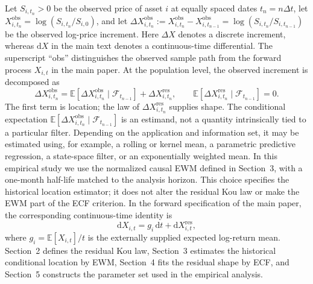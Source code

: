 \documentclass[11pt]{article}
\newcommand{\E}{\mathbb{E}}
\newcommand{\diff}{\mathrm{d}}
\begin{document}
Let $S_{i,t_n}>0$ be the observed price of asset $i$ at equally spaced dates
$t_n=n\Delta t$, let $X_{i,t_n}^{\mathrm{obs}}=\log(S_{i,t_n}/S_{i,0})$, and let
$\Delta X_{i,t_n}^{\mathrm{obs}}
:=X_{i,t_n}^{\mathrm{obs}}-X_{i,t_{n-1}}^{\mathrm{obs}}
=\log(S_{i,t_n}/S_{i,t_{n-1}})$ be the observed log-price increment. Here $\Delta X$
denotes a discrete increment, whereas $\diff X$ in the main text denotes a continuous-time
differential.
The superscript ``obs'' distinguishes the observed sample path from the forward process
$X_{i,t}$ in the main paper. At the population level, the observed increment is decomposed as
\begin{equation}\label{eq:population-location-shape}
\Delta X_{i,t_n}^{\mathrm{obs}}
=
\E\!\left[\Delta X_{i,t_n}^{\mathrm{obs}}\mid\mathcal F_{t_{n-1}}\right]
+\Delta X_{i,t_n}^{\mathrm{res}},
\qquad
\E\!\left[\Delta X_{i,t_n}^{\mathrm{res}}\mid\mathcal F_{t_{n-1}}\right]=0.
\end{equation}
The first term is location; the law of $\Delta X_{i,t_n}^{\mathrm{res}}$ supplies shape.
The conditional expectation
$\E[\Delta X_{i,t_n}^{\mathrm{obs}}\mid\mathcal F_{t_{n-1}}]$ is an estimand, not a
quantity intrinsically tied to a particular filter. Depending on the application and
information set, it may be estimated using, for example, a rolling or kernel mean, a
parametric predictive regression, a state-space filter, or an exponentially weighted mean.
In this empirical study we use the normalized causal EWM defined in Section~3, with a
one-month half-life matched to the analysis horizon. This choice specifies the historical
location estimator; it does not alter the residual Kou law or make the EWM part of the ECF
criterion. In
the forward specification of the main paper, the corresponding continuous-time identity is
\begin{equation}\label{eq:forward-location-shape}
\diff X_{i,t}=g_i\,\diff t+\diff X_{i,t}^{\mathrm{res}},
\end{equation}
where $g_i=\E[X_{i,t}]/t$ is the externally supplied expected log-return mean. Section~2
defines the residual Kou law, Section~3 estimates the historical conditional location by EWM,
Section~4 fits the residual shape by ECF, and Section~5 constructs the parameter set used in
the empirical analysis.
\end{document}
